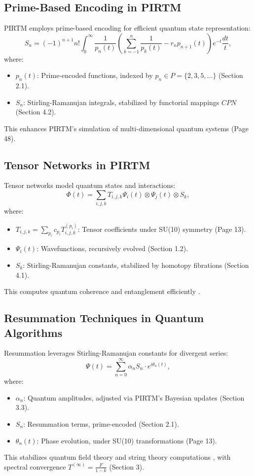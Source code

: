 \documentclass{article}
\theoremstyle{plain}
\begin{document}
\subsection{Prime-Based Encoding in PIRTM}
PIRTM employs prime-based encoding for efficient quantum state representation:
\begin{equation}
S_n = (-1)^{n+1} n! \int_0^{\infty} \frac{1}{p_n(t)} \left( \sum_{k=-1}^n \frac{1}{p_k(t)} - r_n p_{n+1}(t) \right) e^{-t} \frac{dt}{t},
\end{equation}
where:
\begin{itemize}
    \item \( p_n(t) \): Prime-encoded functions, indexed by \( p_n \in P = \{2, 3, 5, \dots\} \) (Section 2.1).
    \item \( S_n \): Stirling-Ramanujan integrals, stabilized by functorial mappings \( CPN \) (Section 4.2).
\end{itemize}
This enhances PIRTM’s simulation of multi-dimensional quantum systems (Page 48).

\subsection{Tensor Networks in PIRTM}
Tensor networks model quantum states and interactions:
\begin{equation}
\Phi(t) = \sum_{i,j,k} T_{i,j,k} \Psi_i(t) \otimes \Psi_j(t) \otimes S_k,
\end{equation}
where:
\begin{itemize}
    \item \( T_{i,j,k} = \sum_{p_i} c_{p_i} T_{i,j,k}^{(p_i)} \): Tensor coefficients under SU(10) symmetry (Page 13).
    \item \( \Psi_i(t) \): Wavefunctions, recursively evolved (Section 1.2).
    \item \( S_k \): Stirling-Ramanujan constants, stabilized by homotopy fibrations (Section 4.1).
\end{itemize}
This computes quantum coherence and entanglement efficiently \cite{Heisenberg1927, Feynman1965}.

\subsection{Resummation Techniques in Quantum Algorithms}
Resummation leverages Stirling-Ramanujan constants for divergent series:
\begin{equation}
\Psi(t) = \sum_{n=0}^\infty \alpha_n S_n \cdot e^{i \theta_n(t)},
\end{equation}
where:
\begin{itemize}
    \item \( \alpha_n \): Quantum amplitudes, adjusted via PIRTM’s Bayesian updates (Section 3.3).
    \item \( S_n \): Resummation terms, prime-encoded (Section 2.1).
    \item \( \theta_n(t) \): Phase evolution, under SU(10) transformations (Page 13).
\end{itemize}
This stabilizes quantum field theory and string theory computations \cite{Kaluza1921, Rovelli2004}, with spectral convergence \( T^{(\infty)} = \frac{F}{1 - k} \) (Section 3).
\end{document}
